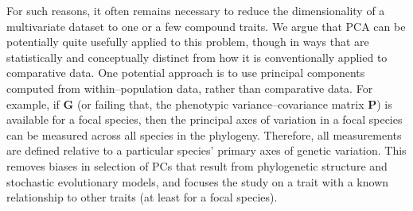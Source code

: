 \documentclass[a4paper,12pt]{article}
\begin{document}


For such reasons, it often remains necessary to reduce the dimensionality of a multivariate dataset to one or a few compound traits. We argue that PCA can be potentially quite usefully applied to this problem, though in ways that are statistically and conceptually distinct from how it is conventionally applied to comparative data. One potential approach is to use principal components computed from within--population data, rather than comparative data. For example, if $\mathbf{G}$ (or failing that, the phenotypic variance--covariance matrix $\mathbf{P}$) is available for a focal species, then the principal axes of variation in a focal species can be measured across all species in the phylogeny. Therefore, all measurements are defined relative to a particular species' primary axes of genetic variation. This removes biases in selection of PCs that result from phylogenetic structure and stochastic evolutionary models, and focuses the study on a trait with a known relationship to other traits (at least for a focal species). 
\end{document}
